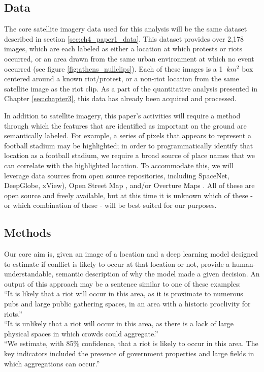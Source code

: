 \subsection{Data}
The core satellite imagery data used for this analysis will be the same dataset described in section \ref{sec:ch4_paper1_data}. This dataset provides over 2,178 images, which are each labeled as either a location at which protests or riots occurred, or an area drawn from the same urban environment at which no event occurred (see figure \ref{fig:athens_nullclips}).  Each of these images is a 1 \textit{$\ km^{2}$} box centered around a known riot/protest, or a non-riot location from the same satellite image as the riot clip. As a part of the quantitative analysis presented in Chapter \ref{sec:chapter3}, this data has already been acquired and processed. 

In addition to satellite imagery, this paper's activities will require a method through which the features that are identified as important on the ground are semantically labeled.  For example, a series of pixels that appears to represent a football stadium may be highlighted; in order to programmatically identify that location as a football stadium, we require a broad source of place names that we can correlate with the highlighted location. To accommodate this, we will leverage data sources from open source repositories, including SpaceNet\citep{SpaceNet}, DeepGlobe\citep{DeepGlobe2018}, xView\citep{xView}), Open Street Map \citep{OpenStreetMap2024}, and/or Overture Maps \citep{OvertureMapsFoundation2023}. All of these are open source and freely available, but at this time it is unknown which of these - or which combination of these - will be best suited for our purposes.

\subsection{Methods}
Our core aim is, given an image of a location and a deep learning model designed to estimate if conflict is likely to occur at that location or not, provide a human-understandable, semantic description of why the model made a given decision.  An output of this approach may be a sentence similar to one of these examples:\\
``It is likely that a riot will occur in this area, as it is proximate to numerous pubs and large public gathering spaces, in an area with a historic proclivity for riots.''\\
``It is unlikely that a riot will occur in this area, as there is a lack of large physical spaces in which crowds could aggregate.''\\
``We estimate, with 85\% confidence, that a riot is likely to occur in this area.  The key indicators included the presence of government properties and large fields in which aggregations can occur.''

